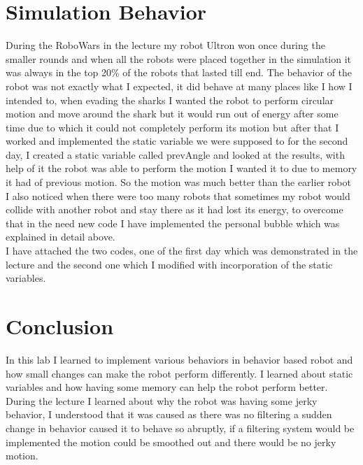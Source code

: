 \documentclass[12pt]{article}
\begin{document}
\section{Simulation Behavior}
During the RoboWars in the lecture my robot Ultron won once during the smaller rounds and when all the robots were placed together in the simulation it was always in the top 20\% of the robots that lasted till end. The behavior of the robot was not exactly what I expected, it did behave at many places like I how I intended to, when evading the sharks I wanted the robot to perform circular motion and move around the shark but it would run out of energy after some time due to which it could not completely perform its motion but after that I worked and implemented the static variable we were supposed to for the second day, I created a static variable called prevAngle and looked at the results, with help of it the robot was able to perform the motion I wanted it to due to memory it had of previous motion. So the motion was much better than the earlier robot\\
I also noticed when there were too many robots that sometimes my robot would collide with another robot and stay there as it had lost its energy, to overcome that in the need new code I have implemented the personal bubble which was explained in detail above.\\
I have attached the two codes, one of the first day which was demonstrated in the lecture and the second one which I modified with incorporation of the static variables.
\section{Conclusion}
In this lab I learned to implement various behaviors in behavior based robot and how small changes can make the robot perform differently. I learned about static variables and how having some memory can help the robot perform better. During the lecture I learned about why the robot was having some jerky behavior, I understood that it was caused as there was no filtering a sudden change in behavior caused it to behave so abruptly, if a filtering system would be implemented the motion could be smoothed out and there would be no jerky motion.
\end{document}
